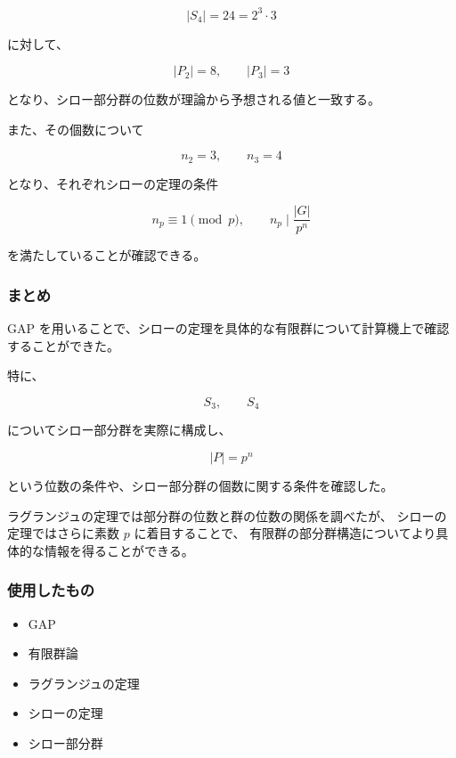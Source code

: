 \[
|S_4|=24=2^3\cdot3
\]

に対して、

\[
|P_2|=8,\qquad |P_3|=3
\]

となり、シロー部分群の位数が理論から予想される値と一致する。

また、その個数について

\[
n_2=3,\qquad n_3=4
\]

となり、それぞれシローの定理の条件

\[
n_p\equiv1\pmod p,
\qquad
n_p\mid\frac{|G|}{p^n}
\]

を満たしていることが確認できる。

\subsubsection{まとめ}

GAP を用いることで、シローの定理を具体的な有限群について計算機上で確認することができた。

特に、

\[
S_3,\qquad S_4
\]

についてシロー部分群を実際に構成し、

\[
|P|=p^n
\]

という位数の条件や、シロー部分群の個数に関する条件を確認した。

ラグランジュの定理では部分群の位数と群の位数の関係を調べたが、
シローの定理ではさらに素数 $p$ に着目することで、
有限群の部分群構造についてより具体的な情報を得ることができる。

\subsubsection{使用したもの}

\begin{itemize}
  \item GAP
  \item 有限群論
  \item ラグランジュの定理
  \item シローの定理
  \item シロー部分群
\end{itemize}